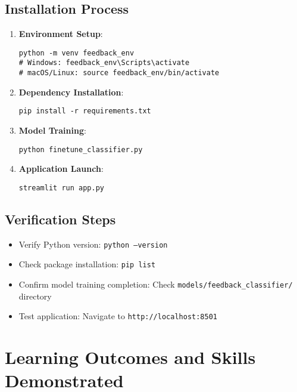 \documentclass[11pt,a4paper]{article}
\begin{document}
\subsection{Installation Process}
\begin{enumerate}
  \item \textbf{Environment Setup}:
  \begin{lstlisting}[style=code]
python -m venv feedback_env
# Windows: feedback_env\Scripts\activate
# macOS/Linux: source feedback_env/bin/activate
  \end{lstlisting}
  
  \item \textbf{Dependency Installation}:
  \begin{lstlisting}[style=code]
pip install -r requirements.txt
  \end{lstlisting}
  
  \item \textbf{Model Training}:
  \begin{lstlisting}[style=code]
python finetune_classifier.py
  \end{lstlisting}
  
  \item \textbf{Application Launch}:
  \begin{lstlisting}[style=code]
streamlit run app.py
  \end{lstlisting}
\end{enumerate}

\subsection{Verification Steps}
\begin{itemize}
  \item Verify Python version: \texttt{python --version}
  \item Check package installation: \texttt{pip list}
  \item Confirm model training completion: Check \texttt{models/feedback\_classifier/} directory
  \item Test application: Navigate to \texttt{http://localhost:8501}
\end{itemize}

\section{Learning Outcomes and Skills Demonstrated}
\end{document}
